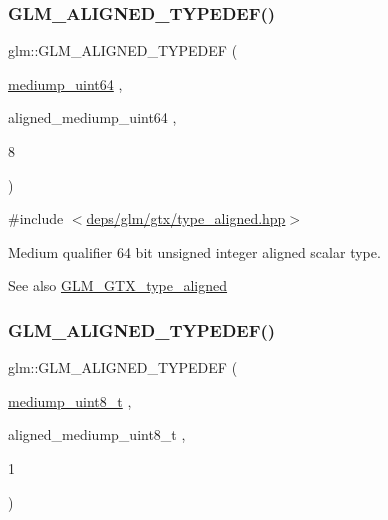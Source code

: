 \subsubsection{\texorpdfstring{G\+L\+M\+\_\+\+A\+L\+I\+G\+N\+E\+D\+\_\+\+T\+Y\+P\+E\+D\+E\+F()}{GLM\_ALIGNED\_TYPEDEF()}\hspace{0.1cm}{\footnotesize\ttfamily [84/209]}}
{\footnotesize\ttfamily glm\+::\+G\+L\+M\+\_\+\+A\+L\+I\+G\+N\+E\+D\+\_\+\+T\+Y\+P\+E\+D\+EF (\begin{DoxyParamCaption}\item[{\hyperlink{group__gtc__type__precision_ga6685788d15d0a973ee7c2460d0456dc1}{mediump\+\_\+uint64}}]{,  }\item[{aligned\+\_\+mediump\+\_\+uint64}]{,  }\item[{8}]{ }\end{DoxyParamCaption})}



{\ttfamily \#include $<$\hyperlink{gtx_2type__aligned_8hpp}{deps/glm/gtx/type\+\_\+aligned.\+hpp}$>$}

Medium qualifier 64 bit unsigned integer aligned scalar type. \begin{DoxySeeAlso}{See also}
\hyperlink{group__gtx__type__aligned}{G\+L\+M\+\_\+\+G\+T\+X\+\_\+type\+\_\+aligned} 
\end{DoxySeeAlso}
\mbox{\label{group__gtx__type__aligned_gaa9cde002439b74fa66120a16a9f55fcc}} 
\subsubsection{\texorpdfstring{G\+L\+M\+\_\+\+A\+L\+I\+G\+N\+E\+D\+\_\+\+T\+Y\+P\+E\+D\+E\+F()}{GLM\_ALIGNED\_TYPEDEF()}\hspace{0.1cm}{\footnotesize\ttfamily [85/209]}}
{\footnotesize\ttfamily glm\+::\+G\+L\+M\+\_\+\+A\+L\+I\+G\+N\+E\+D\+\_\+\+T\+Y\+P\+E\+D\+EF (\begin{DoxyParamCaption}\item[{\hyperlink{group__gtc__type__precision_gadfa38f3c245d371c4b2079f1fd68928b}{mediump\+\_\+uint8\+\_\+t}}]{,  }\item[{aligned\+\_\+mediump\+\_\+uint8\+\_\+t}]{,  }\item[{1}]{ }\end{DoxyParamCaption})}



